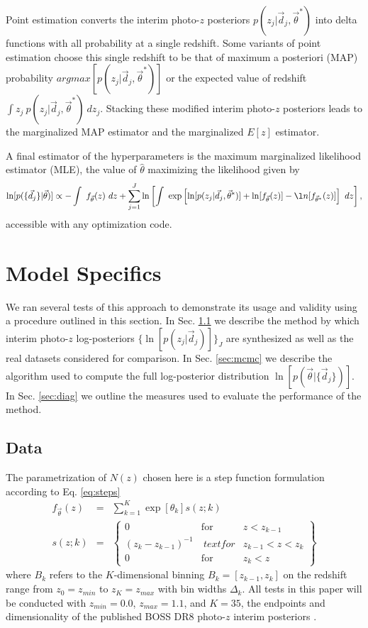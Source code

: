 \documentclass[preprint]{aastex}
\begin{document}
Point estimation converts the interim photo-$z$ posteriors 
$p(z_{j}|\vec{d}_{j},\vec{\theta}^{*})$ into delta functions with all 
probability at a single redshift.  Some variants of point estimation choose 
this single redshift to be that of maximum a posteriori (MAP) probability 
$argmax[p(z_{j}|\vec{d}_{j},\vec{\theta}^{*})]$ or the expected value of 
redshift $\int z_{j}\ p(z_{j}|\vec{d}_{j},\vec{\theta}^{*})\ dz_{j}$.  Stacking 
these modified interim photo-$z$ posteriors leads to the marginalized MAP 
estimator and the marginalized $E[z]$ estimator.

A final estimator of the hyperparameters is the maximum marginalized likelihood 
estimator (MLE), the value of $\hat{\theta}$ maximizing the likelihood given by 
\begin{equation}
\label{eq:mmle}
\ln[p(\{\vec{d}_{j}\}|\vec{\theta})] \propto -\int\ f_{\vec{\theta}}(z)\ 
dz+\sum_{j=1}^{J}\ln\left[\int\ 
\exp\left[\ln[p(z_{j}|\vec{d}_{j},\vec{\theta}^{*})]+\ln[f_{\vec{\theta}}(z)]-\l
n[f_{\vec{\theta}^{*}}(z)]\right]\ dz\right],
\end{equation}
accessible with any optimization code.

\section{Model Specifics}
\label{sec:exp}

We ran several tests of this approach to demonstrate its usage and validity 
using a procedure outlined in this section.  In Sec. \ref{sec:alldata} we 
describe the method by which interim photo-$z$ log-posteriors 
$\{\ln[p(z_{j}|\vec{d}_{j})]\}_{J}$ are synthesized as well as the real 
datasets considered for comparison.  In Sec. \ref{sec:mcmc} we describe the 
algorithm used to compute the full log-posterior distribution 
$\ln[p(\vec{\theta}|\{\vec{d}_{j}\})]$.  In Sec. \ref{sec:diag} we outline the 
measures used to evaluate the performance of the method.

\subsection{Data}
\label{sec:alldata}

The parametrization of $N(z)$ chosen here is a step function formulation 
according to Eq. \ref{eq:steps} 
\begin{eqnarray}
\label{eq:steps}
f_{\vec{\theta}}(z)&=&\sum_{k=1}^{K}\exp[\theta_{k}]s(z;k)\\
s(z;k)&=&\left\{\begin{array}{ccc}0&\text{for}&z<z_{k-1}\\(z_{k}-z_{k-1})^{-1}&\
text{for}&z_{k-1}<z<z_{k}\\0&\text{for}&z_{k}<z\end{array}\right\}
\end{eqnarray}
where $B_{k}$ refers to the $K$-dimensional binning $B_{k}=[z_{k-1},z_{k}]$ on 
the redshift range from $z_{0}=z_{min}$ to $z_{K}=z_{max}$ with bin widths 
$\Delta_{k}$.  All tests in this paper will be conducted with $z_{min}=0.0$, 
$z_{max}=1.1$, and $K=35$, the endpoints and dimensionality of the published 
BOSS DR8 photo-$z$ interim posteriors \citet{Sheldon2012}.
\end{document}
